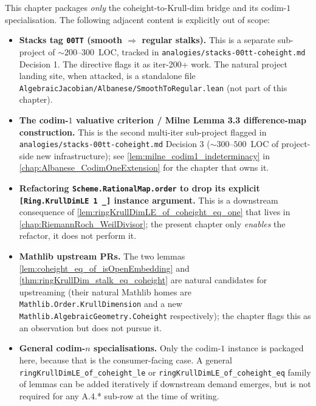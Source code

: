 This chapter packages \emph{only} the coheight-to-Krull-dim bridge and its
codim-\(1\) specialisation. The following adjacent content is explicitly out
of scope:
\begin{itemize}
  \item \textbf{Stacks tag \texttt{00TT} (smooth \(\Rightarrow\) regular stalks).}
    This is a separate sub-project of \(\sim 200\)--\(300\)~LOC, tracked in
    \texttt{analogies/stacks-00tt-coheight.md} Decision 1. The directive
    flags it as iter-200+ work. The natural project landing site, when
    attacked, is a standalone file
    \texttt{AlgebraicJacobian/Albanese/SmoothToRegular.lean} (not part of
    this chapter).
  \item \textbf{The codim-\(1\) valuative criterion / Milne Lemma 3.3
    difference-map construction.} This is the second multi-iter sub-project
    flagged in \texttt{analogies/stacks-00tt-coheight.md} Decision 3
    (\(\sim 300\)--\(500\)~LOC of project-side new infrastructure); see
    \cref{lem:milne_codim1_indeterminacy} in
    \cref{chap:Albanese_CodimOneExtension} for the chapter that owns it.
  \item \textbf{Refactoring \texttt{Scheme.RationalMap.order} to drop its
    explicit \texttt{[Ring.KrullDimLE 1 \_]} instance argument.} This is a
    downstream consequence of \cref{lem:ringKrullDimLE_of_coheight_eq_one}
    that lives in \cref{chap:RiemannRoch_WeilDivisor}; the present chapter
    only \emph{enables} the refactor, it does not perform it.
  \item \textbf{Mathlib upstream PRs.} The two lemmas
    \cref{lem:coheight_eq_of_isOpenEmbedding} and
    \cref{thm:ringKrullDim_stalk_eq_coheight} are natural candidates for
    upstreaming (their natural Mathlib homes are
    \texttt{Mathlib.Order.KrullDimension} and a new
    \texttt{Mathlib.AlgebraicGeometry.Coheight} respectively); the chapter
    flags this as an observation but does not pursue it.
  \item \textbf{General codim-\(n\) specialisations.} Only the codim-\(1\)
    instance is packaged here, because that is the consumer-facing case.
    A general \texttt{ringKrullDimLE\_of\_coheight\_le} or
    \texttt{ringKrullDimLE\_of\_coheight\_eq} family of lemmas can be added
    iteratively if downstream demand emerges, but is not required for any
    A.4.* sub-row at the time of writing.
\end{itemize}
